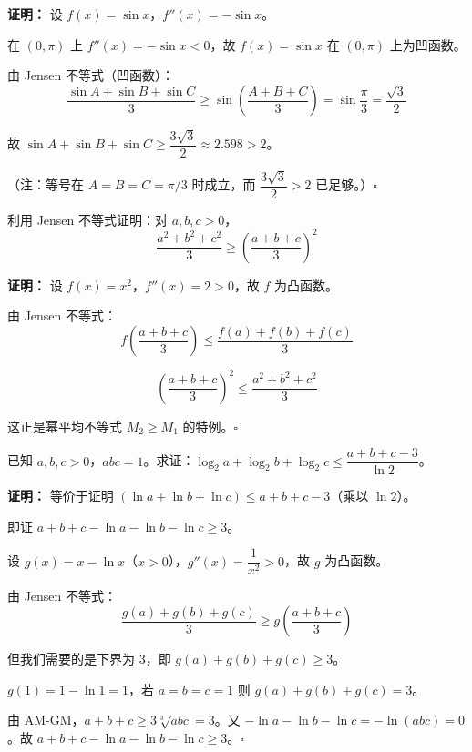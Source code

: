 \documentclass[12pt, a4paper]{ctexart}
\begin{document}
\textbf{证明：} 设 $f(x) = \sin x$，$f''(x) = -\sin x$。

在 $(0, \pi)$ 上 $f''(x) = -\sin x < 0$，故 $f(x) = \sin x$ 在 $(0, \pi)$ 上为凹函数。

由 Jensen 不等式（凹函数）：
$$\frac{\sin A + \sin B + \sin C}{3} \geq \sin\!\left(\frac{A + B + C}{3}\right) = \sin\frac{\pi}{3} = \frac{\sqrt{3}}{2}$$

故 $\sin A + \sin B + \sin C \geq \dfrac{3\sqrt{3}}{2} \approx 2.598 > 2$。

（注：等号在 $A = B = C = \pi/3$ 时成立，而 $\dfrac{3\sqrt{3}}{2} > 2$ 已足够。）$\square$

\begin{examplebox}
利用 Jensen 不等式证明：对 $a, b, c > 0$，
$$\frac{a^2 + b^2 + c^2}{3} \geq \left(\frac{a + b + c}{3}\right)^2$$
\end{examplebox}

\textbf{证明：} 设 $f(x) = x^2$，$f''(x) = 2 > 0$，故 $f$ 为凸函数。

由 Jensen 不等式：
$$f\!\left(\frac{a + b + c}{3}\right) \leq \frac{f(a) + f(b) + f(c)}{3}$$

$$\left(\frac{a + b + c}{3}\right)^2 \leq \frac{a^2 + b^2 + c^2}{3}$$

这正是幂平均不等式 $M_2 \geq M_1$ 的特例。$\square$

\begin{examplebox}[【例题7】利用凹函数证对数不等式]
已知 $a, b, c > 0$，$abc = 1$。求证：$\log_2 a + \log_2 b + \log_2 c \leq \dfrac{a + b + c - 3}{\ln 2}$。
\end{examplebox}

\textbf{证明：} 等价于证明 $(\ln a + \ln b + \ln c) \leq a + b + c - 3$（乘以 $\ln 2$）。

即证 $a + b + c - \ln a - \ln b - \ln c \geq 3$。

设 $g(x) = x - \ln x$（$x > 0$），$g''(x) = \dfrac{1}{x^2} > 0$，故 $g$ 为凸函数。

由 Jensen 不等式：
$$\frac{g(a) + g(b) + g(c)}{3} \geq g\!\left(\frac{a + b + c}{3}\right)$$

但我们需要的是下界为 $3$，即 $g(a) + g(b) + g(c) \geq 3$。

$g(1) = 1 - \ln 1 = 1$，若 $a = b = c = 1$ 则 $g(a) + g(b) + g(c) = 3$。

由 AM-GM，$a + b + c \geq 3\sqrt[3]{abc} = 3$。又 $-\ln a - \ln b - \ln c = -\ln(abc) = 0$。故 $a + b + c - \ln a - \ln b - \ln c \geq 3$。$\square$
\end{document}
